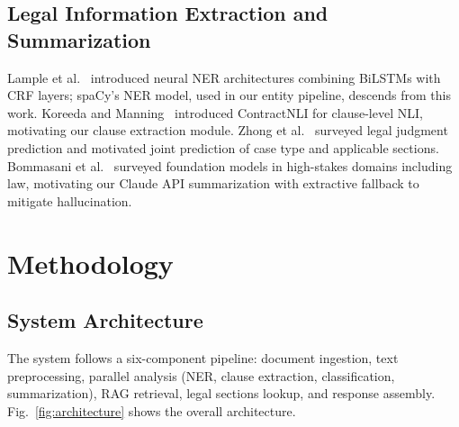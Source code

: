 \documentclass[conference]{IEEEtran}
\begin{document}
\subsection{Legal Information Extraction and Summarization}

Lample et al.~\cite{lample2016ner} introduced neural NER architectures
combining BiLSTMs with CRF layers; spaCy's NER model, used in our entity
pipeline, descends from this work. Koreeda and
Manning~\cite{koreeda2021contractnli} introduced ContractNLI for clause-level
NLI, motivating our clause extraction module. Zhong et al.~\cite{zhong2020ljp}
surveyed legal judgment prediction and motivated joint prediction of case type
and applicable sections. Bommasani et al.~\cite{bommasani2021foundation}
surveyed foundation models in high-stakes domains including law, motivating our
Claude API summarization with extractive fallback to mitigate hallucination.

\section{Methodology}

\subsection{System Architecture}

The system follows a six-component pipeline: document ingestion, text
preprocessing, parallel analysis (NER, clause extraction, classification,
summarization), RAG retrieval, legal sections lookup, and response assembly.
Fig.~\ref{fig:architecture} shows the overall architecture.
\end{document}
